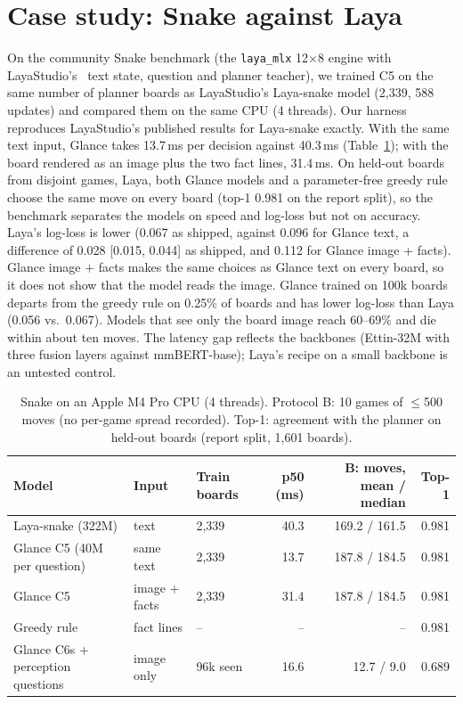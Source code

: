 \documentclass[10pt]{article}
\begin{document}
\section{Case study: Snake against Laya}\label{sec:snake}
On the community Snake benchmark (the \texttt{laya\_mlx} 12$\times$8 engine with LayaStudio's~\cite{layastudio2026} text state, question and planner teacher), we trained C5 on the same number of planner boards as LayaStudio's Laya-snake model (2{,}339, 588 updates) and compared them on the same CPU (4 threads). Our harness reproduces LayaStudio's published results for Laya-snake exactly. With the same text input, Glance takes 13.7\,ms per decision against 40.3\,ms (Table~\ref{tab:snake}); with the board rendered as an image plus the two fact lines, 31.4\,ms. On held-out boards from disjoint games, Laya, both Glance models and a parameter-free greedy rule choose the same move on every board (top-1 0.981 on the report split), so the benchmark separates the models on speed and log-loss but not on accuracy. Laya's log-loss is lower (0.067 as shipped, against 0.096 for Glance text, a difference of 0.028 [0.015, 0.044] as shipped, and 0.112 for Glance image + facts). Glance image + facts makes the same choices as Glance text on every board, so it does not show that the model reads the image. Glance trained on 100k boards departs from the greedy rule on 0.25\% of boards and has lower log-loss than Laya (0.056 vs.\ 0.067). Models that see only the board image reach 60--69\% and die within about ten moves. The latency gap reflects the backbones (Ettin-32M with three fusion layers against mmBERT-base); Laya's recipe on a small backbone is an untested control.

\begin{table}[t]
\centering\footnotesize
\caption{Snake on an Apple M4 Pro CPU (4 threads). Protocol B: 10 games of $\le$500 moves (no per-game spread recorded). Top-1: agreement with the planner on held-out boards (report split, 1{,}601 boards).}
\label{tab:snake}
\setlength\tabcolsep{4pt}
\begin{tabular}{lllrrr}
\toprule
Model & Input & Train boards & p50 (ms) & B: moves, mean / median & Top-1 \\
\midrule
Laya-snake (322M) & text & 2{,}339 & 40.3 & 169.2 / 161.5 & 0.981 \\
Glance C5 (40M per question) & same text & 2{,}339 & 13.7 & 187.8 / 184.5 & 0.981 \\
Glance C5 & image + facts & 2{,}339 & 31.4 & 187.8 / 184.5 & 0.981 \\
Greedy rule & fact lines & -- & -- & -- & 0.981 \\
Glance C6s + perception questions & image only & 96k seen & 16.6 & 12.7 / 9.0 & 0.689 \\
\bottomrule
\end{tabular}
\end{table}
\end{document}
